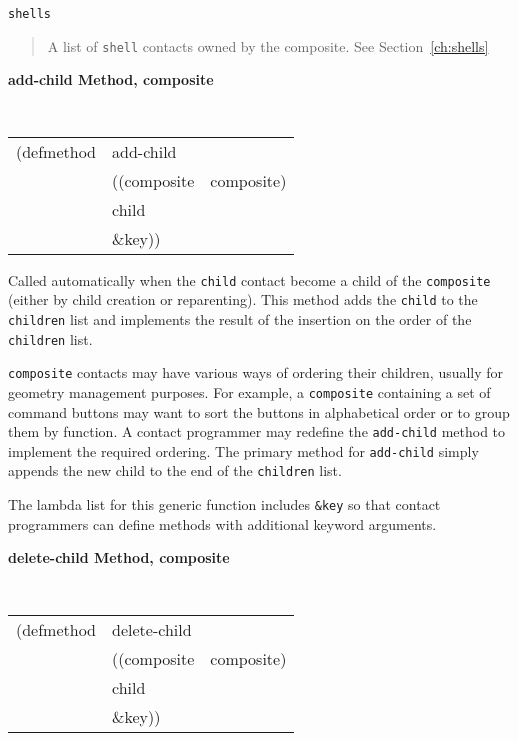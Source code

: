 \begin{flushright} \parbox[t]{6.125in}{
{\tt shells}
\begin{quote}
A list of {\tt shell} contacts owned by the composite. See Section~\ref{ch:shells}
\end{quote} }\end{flushright}

{\samepage
{\large {\bf add-child \hfill Method, composite}}
\begin{flushright} \parbox[t]{6.125in}{
\tt
\begin{tabular}{lll}
\raggedright
(defmethod & add-child & \\
& ((composite  &composite)\\
& child\\
& \&key))
\end{tabular}
\rm

}\end{flushright}}

\begin{flushright} \parbox[t]{6.125in}{
Called automatically when the {\tt child} contact become a child of
the {\tt composite} (either by child creation or reparenting). This
method  adds the {\tt child} to the {\tt children} list and implements
the result of the insertion on the order of the {\tt children} list. 
}\end{flushright}

\begin{flushright} \parbox[t]{6.125in}{
{\tt composite} contacts may have various ways of ordering their
children, usually for geometry management purposes. For example, a
{\tt composite} containing a set of command buttons may want to sort the
buttons in alphabetical order or to group them by function. A contact
programmer may redefine the {\tt add-child} method to implement the
required ordering. The primary method for {\tt add-child} simply
appends the new child to the end of the  {\tt children} list.

The lambda list for this generic function includes {\tt \&key} so that contact
programmers can define methods with additional keyword arguments.
}\end{flushright}


{\large {\bf delete-child \hfill Method, composite}}
\begin{flushright} \parbox[t]{6.125in}{
\tt
\begin{tabular}{lll}
\raggedright
(defmethod & delete-child & \\
& ((composite  &composite)\\
& child\\
& \&key))
\end{tabular}
\rm

}\end{flushright}

